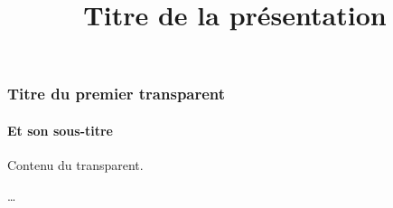 \documentclass{beamer}
\begin{document}
\title{Titre de la présentation}
\maketitle

\begin{frame} %
\frametitle{Titre du premier transparent}
\framesubtitle{Et son sous-titre}

Contenu du transparent.

\end{frame}

\begin{frame} %
…
\end{frame}
\end{document}
